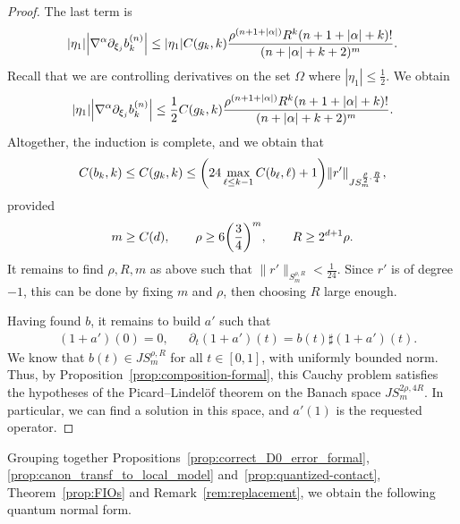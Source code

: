 \documentclass[10pt]{amsart}
\theoremstyle{definition}\newtheorem{defi}[theo]{Definition}\newtheorem{rema}[theo]{Remark}\newtheorem{exam}[theo]{Example}\newtheorem{exem}[theo]{Example}\newtheorem{nota}[theo]{Notation}
\newcommand\1{\mathds{1}}
\let\originalleft\left
\let\originalright\right
\renewcommand{\left}{\mathopen{}\mathclose\bgroup\originalleft}
\renewcommand{\right}{\aftergroup\egroup\originalright}
\begin{document}
\begin{proof}
The last term is
\[
|\eta_{1}|\left|\nabla^{\alpha}\partial_{\xi_j}b_k^{(n)}\right|
\leq |\eta_{1}|C(g_k,k)\frac{\rho^{(n+1+|\alpha|)}R^k(n+1+|\alpha|+k)!}{(n+|\alpha|+k+2)^m}.
\]
Recall that we are controlling derivatives on the set $\Omega$ where $|\eta_1|\leq \frac 12$. We obtain
\[
|\eta_{1}|\left|\nabla^{\alpha}\partial_{\xi_j}b_k^{(n)}
\right|\leq
\frac 12 C(g_k,k)\frac{\rho^{(n+1+|\alpha|)}R^k(n+1+|\alpha|+k)!}{(n+|\alpha|+k+2)^m}.
\]
Altogether, the induction is complete, and we obtain that
\[
C(b_k,k)\leq C(g_k,k)\leq \left(24\max_{\ell\leq k-1}C(b_{\ell},\ell)+1\right)\|r'\|_{JS^{\frac{\rho}2, \frac R4}_{m}},
\]
provided
\begin{align*}
m\geq C(d),\qquad\rho\geq 6\left(\frac 34\right)^m,\qquad R\geq 2^{d+1}\rho.
\end{align*}
It remains to find $\rho,R,m$ as above such that $\|r'\|_{S^{\rho,R}_m}<\frac{1}{24}$. Since $r'$ is of degree $-1$, this can be done by fixing $m$ and $\rho$, then choosing $R$ large enough.

Having found $b$, it remains to build $a'$ such that
\begin{align*}
&(1+a')(0)=0,& &\partial_t (1+a')(t) = b(t)\sharp (1+a')(t).
\end{align*}
We know that $b(t)\in JS^{\rho,R}_m$ for all $t\in [0,1]$, with uniformly bounded norm. Thus, by Proposition~\ref{prop:composition-formal}, this Cauchy problem satisfies the hypotheses of the Picard--Lindel\"of theorem on the Banach space $JS^{2\rho,4R}_m$. In particular, we can find a solution in this space, and $a'(1)$ is the requested operator.
\end{proof}

Grouping together Propositions~\ref{prop:correct_D0_error_formal}, \ref{prop:canon_transf_to_local_model} and~\ref{prop:quantized-contact}, Theorem~\ref{prop:FIOs} and Remark~\ref{rem:replacement}, we obtain the following quantum normal form.
\end{document}
